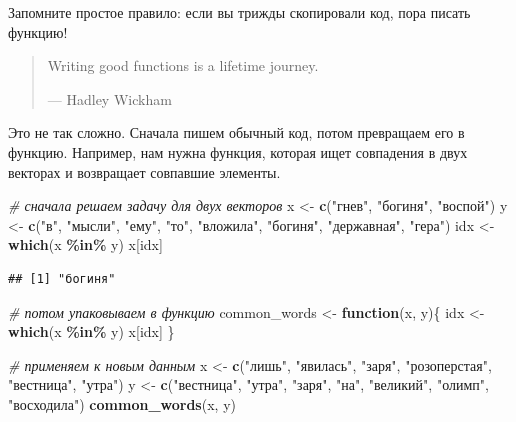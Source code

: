\documentclass[
]{book}
\newenvironment{Shaded}{\begin{snugshade}}{\end{snugshade}}
\newcommand{\CommentTok}[1]{\textcolor[rgb]{0.56,0.35,0.01}{\textit{#1}}}
\newcommand{\ControlFlowTok}[1]{\textcolor[rgb]{0.13,0.29,0.53}{\textbf{#1}}}
\newcommand{\FunctionTok}[1]{\textcolor[rgb]{0.13,0.29,0.53}{\textbf{#1}}}
\newcommand{\NormalTok}[1]{#1}
\newcommand{\OtherTok}[1]{\textcolor[rgb]{0.56,0.35,0.01}{#1}}
\newcommand{\SpecialCharTok}[1]{\textcolor[rgb]{0.81,0.36,0.00}{\textbf{#1}}}
\newcommand{\StringTok}[1]{\textcolor[rgb]{0.31,0.60,0.02}{#1}}
\theoremstyle{definition}
\theoremstyle{definition}
\theoremstyle{definition}
\theoremstyle{definition}
\theoremstyle{remark}
\begin{document}
Запомните простое правило: если вы трижды скопировали код, пора писать функцию!

\begin{quote}
Writing good functions is a lifetime journey.

--- Hadley Wickham
\end{quote}

Это не так сложно. Сначала пишем обычный код, потом превращаем его в функцию. Например, нам нужна функция, которая ищет совпадения в двух векторах и возвращает совпавшие элементы.

\begin{Shaded}
\begin{Highlighting}[]
\CommentTok{\# сначала решаем задачу для двух векторов}
\NormalTok{x }\OtherTok{\textless{}{-}} \FunctionTok{c}\NormalTok{(}\StringTok{"гнев"}\NormalTok{, }\StringTok{"богиня"}\NormalTok{, }\StringTok{"воспой"}\NormalTok{)}
\NormalTok{y }\OtherTok{\textless{}{-}} \FunctionTok{c}\NormalTok{(}\StringTok{"в"}\NormalTok{, }\StringTok{"мысли"}\NormalTok{, }\StringTok{"ему"}\NormalTok{, }\StringTok{"то"}\NormalTok{, }\StringTok{"вложила"}\NormalTok{, }\StringTok{"богиня"}\NormalTok{, }\StringTok{"державная"}\NormalTok{, }\StringTok{"гера"}\NormalTok{)}
\NormalTok{idx }\OtherTok{\textless{}{-}} \FunctionTok{which}\NormalTok{(x }\SpecialCharTok{\%in\%}\NormalTok{ y)}
\NormalTok{x[idx]}
\end{Highlighting}
\end{Shaded}

\begin{verbatim}
## [1] "богиня"
\end{verbatim}

\begin{Shaded}
\begin{Highlighting}[]
\CommentTok{\# потом упаковываем в функцию}
\NormalTok{common\_words }\OtherTok{\textless{}{-}} \ControlFlowTok{function}\NormalTok{(x, y)\{}
\NormalTok{  idx }\OtherTok{\textless{}{-}} \FunctionTok{which}\NormalTok{(x }\SpecialCharTok{\%in\%}\NormalTok{ y)}
\NormalTok{  x[idx]}
\NormalTok{\}}

\CommentTok{\# применяем к новым данным}
\NormalTok{x }\OtherTok{\textless{}{-}} \FunctionTok{c}\NormalTok{(}\StringTok{"лишь"}\NormalTok{, }\StringTok{"явилась"}\NormalTok{, }\StringTok{"заря"}\NormalTok{, }\StringTok{"розоперстая"}\NormalTok{, }\StringTok{"вестница"}\NormalTok{, }\StringTok{"утра"}\NormalTok{)}
\NormalTok{y }\OtherTok{\textless{}{-}} \FunctionTok{c}\NormalTok{(}\StringTok{"вестница"}\NormalTok{, }\StringTok{"утра"}\NormalTok{, }\StringTok{"заря"}\NormalTok{, }\StringTok{"на"}\NormalTok{, }\StringTok{"великий"}\NormalTok{, }\StringTok{"олимп"}\NormalTok{, }\StringTok{"восходила"}\NormalTok{)}
\FunctionTok{common\_words}\NormalTok{(x, y)}
\end{Highlighting}
\end{Shaded}
\end{document}
